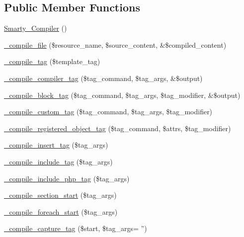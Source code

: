 \subsection*{\-Public \-Member \-Functions}
\begin{DoxyCompactItemize}
\item 
\hyperlink{class_smarty___compiler_ad6ab19d93f6afc09b6fa7a09947f7a20}{\-Smarty\-\_\-\-Compiler} ()
\item 
\hyperlink{class_smarty___compiler_acfef9359d4a045b3c17bb36c713d80dc}{\-\_\-compile\-\_\-file} (\$resource\-\_\-name, \$source\-\_\-content, \&\$compiled\-\_\-content)
\item 
\hyperlink{class_smarty___compiler_a2a8edf6c0079fb0fa53d98837f17ff8c}{\-\_\-compile\-\_\-tag} (\$template\-\_\-tag)
\item 
\hyperlink{class_smarty___compiler_a7436c858b44c88f75ac8e91480c778c1}{\-\_\-compile\-\_\-compiler\-\_\-tag} (\$tag\-\_\-command, \$tag\-\_\-args, \&\$output)
\item 
\hyperlink{class_smarty___compiler_aa2e5d024c2c566aa9baeb4636928de18}{\-\_\-compile\-\_\-block\-\_\-tag} (\$tag\-\_\-command, \$tag\-\_\-args, \$tag\-\_\-modifier, \&\$output)
\item 
\hyperlink{class_smarty___compiler_a0ea053fe2f6c92701832d805ee99840f}{\-\_\-compile\-\_\-custom\-\_\-tag} (\$tag\-\_\-command, \$tag\-\_\-args, \$tag\-\_\-modifier)
\item 
\hyperlink{class_smarty___compiler_ae513c736559da523560a8699db475881}{\-\_\-compile\-\_\-registered\-\_\-object\-\_\-tag} (\$tag\-\_\-command, \$attrs, \$tag\-\_\-modifier)
\item 
\hyperlink{class_smarty___compiler_a155076f7f3939480a7cbb17ae1b79d7d}{\-\_\-compile\-\_\-insert\-\_\-tag} (\$tag\-\_\-args)
\item 
\hyperlink{class_smarty___compiler_ad57897c82c75a0a37868853a544368d5}{\-\_\-compile\-\_\-include\-\_\-tag} (\$tag\-\_\-args)
\item 
\hyperlink{class_smarty___compiler_a92a50ae51f7da35e56d58065d2f880ef}{\-\_\-compile\-\_\-include\-\_\-php\-\_\-tag} (\$tag\-\_\-args)
\item 
\hyperlink{class_smarty___compiler_ab1362bbbec0dd0376e46c46c7af6fe4e}{\-\_\-compile\-\_\-section\-\_\-start} (\$tag\-\_\-args)
\item 
\hyperlink{class_smarty___compiler_a84b4644d15ae71ec55412e8c26cd702b}{\-\_\-compile\-\_\-foreach\-\_\-start} (\$tag\-\_\-args)
\item 
\hyperlink{class_smarty___compiler_acbc6398ee7fbeb22e3ad5ee79b889fcc}{\-\_\-compile\-\_\-capture\-\_\-tag} (\$start, \$tag\-\_\-args= '')

\end{DoxyCompactItemize}
